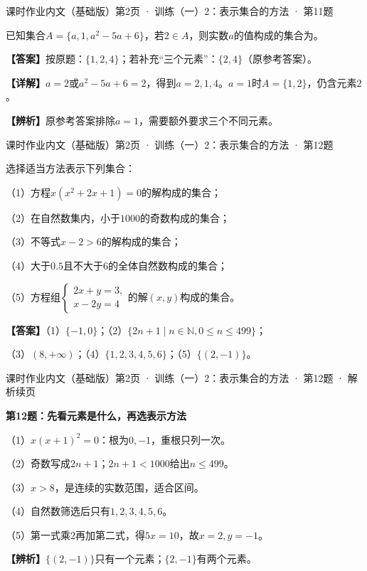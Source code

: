 \documentclass[UTF8,10pt,aspectratio=169]{ctexbeamer}
\newcommand{\Answer}[1]{\par\vspace{0.2cm}\textbf{【答案】}#1}
\newcommand{\Analysis}[1]{\par\vspace{0.2cm}\textbf{【详解】}#1}
\newcommand{\N}{\mathbb N}
\newcommand{\blank}{\underline{\hspace{1.6cm}}}
\newcommand{\Tip}[1]{\par\vspace{0.2cm}\textbf{【辨析】}#1}
\newcommand{\Source}[1]{{\scriptsize\color{gray}#1}\par\vspace{0.25cm}}
\begin{document}
\begin{frame}
\Source{课时作业内文（基础版）第2页 · 训练（一）2：表示集合的方法 · 第11题}
已知集合$A=\{a,1,a^2-5a+6\}$，若$2\in A$，则实数$a$的值构成的集合为\blank。
\pause
\Answer{按原题：$\{1,2,4\}$；若补充“三个元素”：$\{2,4\}$（原参考答案）。}
\Analysis{$a=2$或$a^2-5a+6=2$，得到$a=2,1,4$。$a=1$时$A=\{1,2\}$，仍含元素$2$。}
\Tip{原参考答案排除$a=1$，需要额外要求三个不同元素。}
\end{frame}
\begin{frame}
\Source{课时作业内文（基础版）第2页 · 训练（一）2：表示集合的方法 · 第12题}
选择适当方法表示下列集合：
\par （1）方程$x(x^2+2x+1)=0$的解构成的集合；
\par （2）在自然数集内，小于$1000$的奇数构成的集合；
\par （3）不等式$x-2>6$的解构成的集合；
\par （4）大于$0.5$且不大于$6$的全体自然数构成的集合；
\par （5）方程组$\begin{cases}2x+y=3,\\x-2y=4\end{cases}$的解$(x,y)$构成的集合。
\pause
\Answer{（1）$\{-1,0\}$；（2）$\{2n+1\mid n\in\N,0\le n\le499\}$；\par （3）$(8,+\infty)$；（4）$\{1,2,3,4,5,6\}$；（5）$\{(2,-1)\}$。}
\end{frame}
\begin{frame}
\Source{课时作业内文（基础版）第2页 · 训练（一）2：表示集合的方法 · 第12题 · 解析续页}

\textbf{第12题：先看元素是什么，再选表示方法}
\par\vspace{0.3cm}
（1）$x(x+1)^2=0$：根为$0,-1$，重根只列一次。
\par （2）奇数写成$2n+1$；$2n+1<1000$给出$n\le499$。
\par （3）$x>8$，是连续的实数范围，适合区间。
\pause\par\vspace{0.3cm}
（4）自然数筛选后只有$1,2,3,4,5,6$。
\par （5）第一式乘$2$再加第二式，得$5x=10$，故$x=2,y=-1$。
\Tip{$\{(2,-1)\}$只有一个元素；$\{2,-1\}$有两个元素。}

\end{frame}
\end{document}
